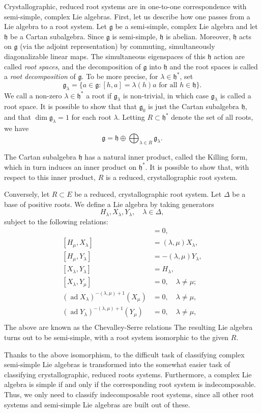 \documentclass[12pt]{article}
\newcommand{\fg}{\mathfrak{g}}
\newcommand{\fh}{\mathfrak{h}}
\DeclareMathOperator{\ad}{ad}
\begin{document}
Crystallographic, reduced root systems are in one-to-one
correspondence with semi-simple, complex Lie algebras.  First, let us
describe how one passes from a Lie algebra to a root system. Let $\fg$
be a semi-simple, complex Lie algebra and let $\fh$ be a Cartan
subalgebra.  Since $\fg$ is semi-simple, $\fh$ is abelian.  Moreover,
$\fh$ acts on $\fg$ (via the adjoint representation) by commuting,
simultaneously diagonalizable linear maps.  The simultaneous
eigenspaces of this $\fh$ action are called {\em root spaces}, and the
decomposition of $\fg$ into $\fh$ and the root spaces is called a {\em
  root decomposition} of $\fg$. To be more precise, for
$\lambda\in\fh^*$, set $$\fg_\lambda=\{a\in\fg \colon [h,a] =
\lambda(h) a \text{ for all } h\in \fh\}.$$
We call a non-zero
$\lambda\in\fh^*$ a root if $\fg_\lambda$ is non-trivial, in which
case $\fg_\lambda$ is called a root space.  It is possible to show
that that $\fg_0$ is just the Cartan subalgebra $\fh$, and that
$\dim\fg_\lambda=1$ for each root $\lambda$.  Letting $R\subset\fh^*$
denote the set of all roots, we have $$\fg=\fh\oplus
\bigoplus_{\lambda\in R} \fg_\lambda.$$

The Cartan subalgebra $\fh$ has a natural inner product, called the
Killing form, which in turn induces an inner product on $\fh^*$. It is
possible to show that, with respect to this inner product, $R$ is a
reduced, crystallographic root system.

Conversely, let $R\subset E$ be a reduced, crystallographic root
system. Let $\Delta$ be a base of positive roots.  We define a Lie
algebra by taking generators
\[H_\lambda,X_\lambda,Y_\lambda,\quad \lambda\in \Delta,\]
subject to the following relations:
\begin{align*}
  [H_\lambda,H_\mu]&=0,\\
  [H_\mu,X_\lambda]&=(\lambda,\mu) X_\lambda,\\
  [H_\mu,Y_\lambda]&=-(\lambda,\mu) Y_{\lambda},\\
  [X_\lambda,Y_\lambda] &= H_\lambda,\\
  [X_\lambda,Y_\mu] &= 0,\quad \lambda\neq \mu;\\
  (\ad X_\lambda)^{-(\lambda,\mu)+1} (X_\mu) &= 0,\quad \lambda\neq \mu,\\
  (\ad Y_\lambda)^{-(\lambda,\mu)+1}(Y_\mu) &= 0,\quad \lambda\neq \mu,\\
\end{align*}
The above are known as the Chevalley-Serre relations The resulting Lie
algebra turns out to be semi-simple, with a root system isomorphic to
the given $R$.


Thanks to the above isomorphism, to the difficult task of classifying
complex semi-simple Lie algebras is transformed into the somewhat
easier task of classifying crystallographic, reduced roots systems.
Furthermore, a complex Lie algebra is simple if and only if the
corresponding root system is indecomposable.  Thus, we only need to
classify indecomposable root systems, since all other root systems and
semi-simple Lie algebras are built out of these.
\end{document}
